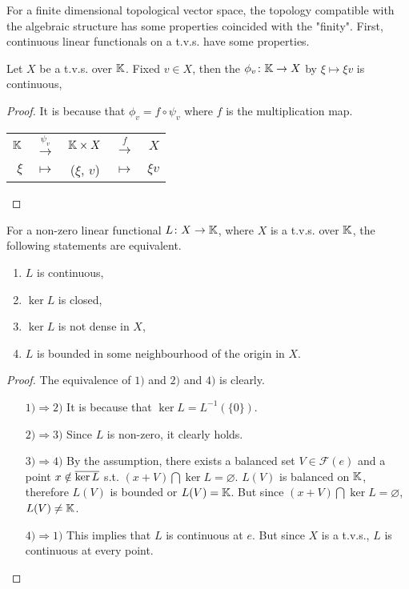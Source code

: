 \documentclass[a4paper,11pt]{report}
\begin{document}
For a finite dimensional topological vector space, the topology compatible with the algebraic structure has some properties coincided with the "finity". First, continuous linear functionals on a t.v.s. have some properties.

\begin{lem}
	Let $X$ be a t.v.s. over $\mathbb{K}$. Fixed $v \in X$, then the $\phi_{v} \colon \mathbb{K} \rightarrow X$ by $\xi \mapsto \xi v$ is continuous,
\end{lem}
\begin{proof}
	It is because that $\phi_{v} = f \circ \psi_{v}$ where $f$ is the multiplication map.
	\begin{center}
		\begin{tabular}{r l c l r}
			$\mathbb{K}$ & $\stackrel{\psi_{v}}{\rightarrow}$ & $\mathbb{K} \times X$ & $\stackrel{f}{\rightarrow}$ & $X$ \\
			$\xi$ & $\mapsto$ & ($\xi$, $v$) & $\mapsto$ & $\xi v$ 
		\end{tabular} 
	\end{center}
\end{proof}

\begin{lem}
	For a non-zero linear functional $L \colon X \rightarrow \mathbb{K}$, where $X$ is a t.v.s. over $\mathbb{K}$, the following statements are equivalent.
	\begin{enumerate}[label=\arabic*)]
		\item $L$ is continuous,
		\item $\ker{L}$ is closed,
		\item $\ker{L}$ is not dense in $X$,
		\item $L$ is bounded in some neighbourhood of the origin in $X$.
	\end{enumerate}
\end{lem}
\begin{proof}
	The equivalence of $1)$ and $2)$ and $4)$ is clearly.
	\begin{enumerate}
		\item[$1) \Rightarrow 2)$] It is because that $\ker{L} = L^{-1}(\{0\})$.
		\item[$2) \Rightarrow 3)$] Since $L$ is non-zero, it clearly holds.
		\item[$3) \Rightarrow 4)$] By the assumption, there exists a balanced set $V \in \mathscr{F}(e)$ and a point $x \notin \overline{\ker{L}}$ s.t. $(x+V) \bigcap \ker{L} = \varnothing$. $L(V)$ is balanced on $\mathbb{K}$, therefore $L(V)$ is bounded or $L(V) = \mathbb{K}$. But since $(x+V) \bigcap \ker{L} = \varnothing$, $L(V) \neq \mathbb{K}$.
		\item[$4) \Rightarrow 1)$] This implies that $L$ is continuous at $e$. But since $X$ is a t.v.s., $L$ is continuous at every point. \qedhere
	\end{enumerate}
\end{proof}
\end{document}
